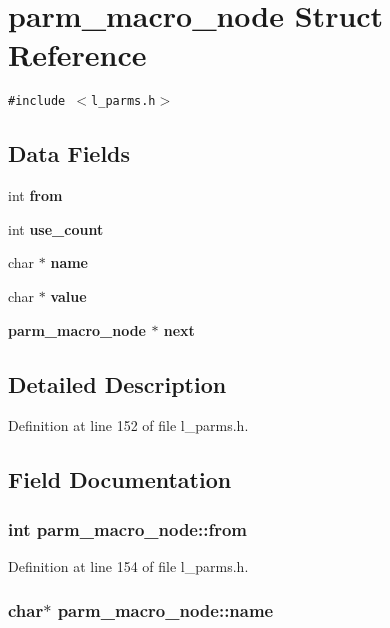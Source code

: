 \section{parm\_\-macro\_\-node Struct Reference}
\label{structparm__macro__node}
{\tt \#include $<$l\_\-parms.h$>$}

\subsection*{Data Fields}
\begin{CompactItemize}
\item 
int \bf{from}
\item 
int \bf{use\_\-count}
\item 
char $\ast$ \bf{name}
\item 
char $\ast$ \bf{value}
\item 
\bf{parm\_\-macro\_\-node} $\ast$ \bf{next}
\end{CompactItemize}


\subsection{Detailed Description}




Definition at line 152 of file l\_\-parms.h.

\subsection{Field Documentation}
\subsubsection{\setlength{\rightskip}{0pt plus 5cm}int \bf{parm\_\-macro\_\-node::from}}\label{structparm__macro__node_8931190cdbba6cfac3cb3480a6750d98}




Definition at line 154 of file l\_\-parms.h.
\subsubsection{\setlength{\rightskip}{0pt plus 5cm}char$\ast$ \bf{parm\_\-macro\_\-node::name}}\label{structparm__macro__node_bfd7f7dfa8875b2eab8f2c031e884136}




